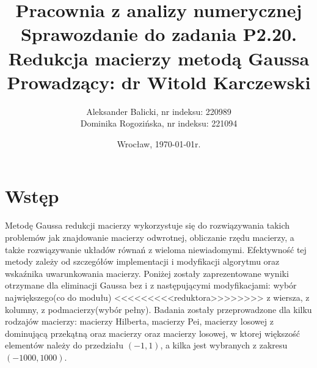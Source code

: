 \documentclass[a4paper,10pt]{article}
\title{{\textbf{Pracownia z analizy numerycznej}}\\[1ex]
       {\Large Sprawozdanie do zadania \textbf{P2.20.}}\\[-1ex]
       {\Large Redukcja macierzy metodą Gaussa}\\
       {\large Prowadzący: dr Witold Karczewski}}
\author{Aleksander Balicki, \large nr indeksu: 220989\\
	Dominika Rogozińska, \large nr indeksu: 221094}
\date{Wrocław, \today r.}
\begin{document}
\maketitle

\section{Wstęp}
\setcounter{equation}{0}
Metodę Gaussa redukcji macierzy wykorzystuje się do rozwiązywania takich problemów jak znajdowanie macierzy odwrotnej, obliczanie rzędu macierzy, a także rozwiązywanie układów równań z wieloma niewiadomymi. Efektywność tej metody zależy od szczegółów implementacji i modyfikacji algorytmu oraz wskaźnika uwarunkowania macierzy. Poniżej zostały zaprezentowane wyniki otrzymane dla eliminacji Gaussa bez i z następującymi modyfikacjami: wybór największego(co do modułu) <<<<<<<<<reduktora>>>>>>>> z wiersza, z kolumny, z podmacierzy(wybór pełny). Badania zostały przeprowadzone dla kilku rodzajów macierzy: macierzy Hilberta, macierzy Pei, macierzy losowej z dominującą przekątną oraz macierzy oraz macierzy losowej, w ktorej większość elementów należy do przedziału $(-1,1)$, a kilka jest wybranych z zakresu $(-1000,1000)$.
\end{document}
